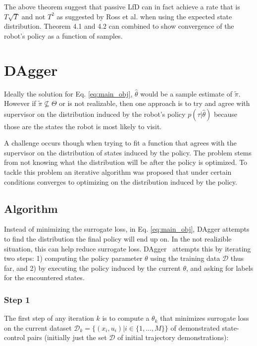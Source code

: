 \documentclass[10pt, conference]{ieeeconf}      %
\begin{document}
 The above theorem suggest that passive LfD can in fact achieve a rate that is $T\sqrt{T}$ and not $T^2$ as suggested by Ross et al. \cite{ross2010reduction,ross2010efficient} when using the expected state distribution.  Theorem 4.1 and 4.2 can combined to show convergence of the robot's policy as a function of samples. 


\section{DAgger}\label{sec:DAgger}
Ideally the solution for Eq. \ref{eq:main_obj}, $\hat{\theta}$ would be a sample estimate of $\tilde{\pi}$. However if $\tilde{\pi} \nsubseteq \Theta$ or is not realizable, then one approach is to try and agree with supervisor on the distribution induced by the robot's policy $p(\tau|\hat{\theta})$ because those are the states the robot is most likely to visit. 

A challenge occurs though when trying to fit a function that agrees with the supervisor on the distribution of states induced by the policy. The problem stems from not knowing what the distribution will be after the policy is optimized. To tackle this problem an iterative algorithm was proposed that under certain conditions converges to optimizing on the distribution induced by the policy. 


 \subsection{Algorithm}
Instead of  minimizing the surrogate loss, in Eq. \ref{eq:main_obj},  DAgger attempts to find the distribution the final policy will end up on. In the not realizible situation, this can help reduce surrogate loss. 
DAgger~\cite{ross2010reduction} attempts this by iterating two steps: 1)
computing the policy parameter $\theta$ using the training data $\mathcal{D}$ thus far, and 2) by executing the policy
induced by the current $\theta$, and asking for labels for the encountered states. 
 
\subsubsection{Step 1}
The first step of any iteration $k$ is to compute a $\theta_k$ that minimizes surrogate loss on the current dataset $\mathcal{D}_k=\{(x_i,u_i)|i\in\{1,\ldots,M\}\}$ of demonstrated state-control pairs (initially just the set $\mathcal{D}$ of initial trajectory demonstrations):
\end{document}
